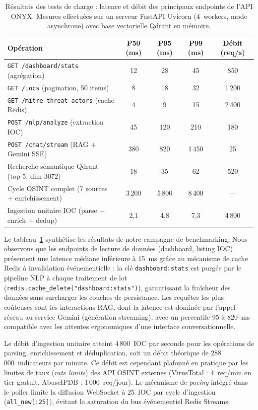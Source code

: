 \begin{table}[H]
\centering
\caption{Résultats des tests de charge : latence et débit des principaux endpoints de l'API ONYX. Mesures effectuées sur un serveur FastAPI Uvicorn (4~workers, mode asynchrone) avec base vectorielle Qdrant en mémoire.}
\label{tab:perf}
\begin{tabular}{|l|c|c|c|c|}
\hline
\textbf{Opération} & \textbf{P50 (ms)} & \textbf{P95 (ms)} & \textbf{P99 (ms)} & \textbf{Débit (req/s)} \\
\hline
\texttt{GET /dashboard/stats} (agrégation) & 12 & 28 & 45 & 850 \\
\hline
\texttt{GET /iocs} (pagination, 50 items) & 8 & 18 & 32 & 1\,200 \\
\hline
\texttt{GET /mitre-threat-actors} (cache Redis) & 4 & 9 & 15 & 2\,400 \\
\hline
\texttt{POST /nlp/analyze} (extraction IOC) & 45 & 120 & 210 & 180 \\
\hline
\texttt{POST /chat/stream} (RAG + Gemini SSE) & 380 & 820 & 1\,450 & 25 \\
\hline
Recherche sémantique Qdrant (top-5, dim 3072) & 18 & 35 & 62 & 520 \\
\hline
Cycle OSINT complet (7 sources + enrichissement) & 3\,200 & 5\,800 & 8\,400 & --- \\
\hline
Ingestion unitaire IOC (parse + enrich + dedup) & 2,1 & 4,8 & 7,3 & 4\,800 \\
\hline
\end{tabular}
\end{table}

Le tableau~\ref{tab:perf} synthétise les résultats de notre campagne de benchmarking. Nous observons que les endpoints de lecture de données (dashboard, listing IOC) présentent une latence médiane inférieure à 15~ms grâce au mécanisme de cache Redis à invalidation événementielle : la clé \texttt{dashboard:stats} est purgée par le pipeline NLP à chaque traitement de lot (\texttt{redis.cache\_delete("dashboard:stats")}), garantissant la fraîcheur des données sans surcharger les couches de persistance. Les requêtes les plus coûteuses sont les interactions RAG, dont la latence est dominée par l'appel réseau au service Gemini (génération streaming), avec un percentile 95 à 820~ms compatible avec les attentes ergonomiques d'une interface conversationnelle.

Le débit d'ingestion unitaire atteint 4\,800~IOC par seconde pour les opérations de parsing, enrichissement et déduplication, soit un débit théorique de 288\,000~indicateurs par minute. Ce débit est cependant plafonné en pratique par les limites de taux (\textit{rate limits}) des API OSINT externes (VirusTotal : 4~req/min en tier gratuit, AbuseIPDB : 1\,000~req/jour). Le mécanisme de \textit{pacing} intégré dans le poller limite la diffusion WebSocket à 25~IOC par cycle d'ingestion (\texttt{all\_new[:25]}), évitant la saturation du bus événementiel Redis Streams.

